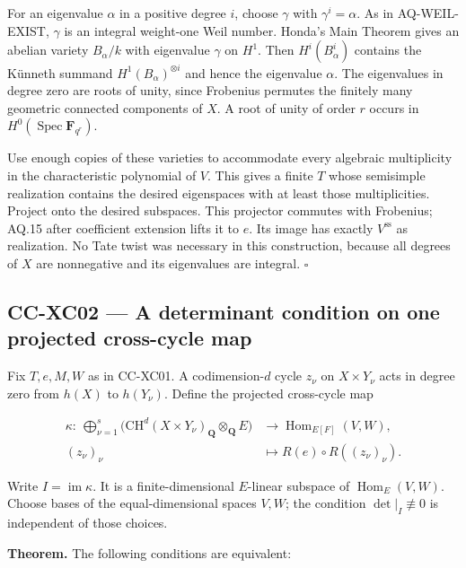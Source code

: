 \documentclass[11pt,a4paper]{article}
\theoremstyle{definition}\newtheorem{definition}[theorem]{Definition}
\theoremstyle{remark}\newtheorem{remark}[theorem]{Remark}
\begin{document}
For an eigenvalue \(\alpha\) in a positive degree \(i\), choose
\(\gamma\) with \(\gamma^i=\alpha\). As in AQ-WEIL-EXIST, \(\gamma\) is
an integral weight-one Weil number. Honda's Main Theorem gives an
abelian variety \(B_\alpha/k\) with eigenvalue \(\gamma\) on \(H^1\).
Then \(H^i(B_\alpha^i)\) contains the Künneth summand
\(H^1(B_\alpha)^{\otimes i}\) and hence the eigenvalue \(\alpha\). The
eigenvalues in degree zero are roots of unity, since Frobenius permutes
the finitely many geometric connected components of \(X\). A root of
unity of order \(r\) occurs in
\(H^0(\operatorname{Spec}\mathbf F_{q^r})\).

Use enough copies of these varieties to accommodate every algebraic
multiplicity in the characteristic polynomial of \(V\). This gives a
finite \(T\) whose semisimple realization contains the desired
eigenspaces with at least those multiplicities. Project onto the desired
subspaces. This projector commutes with Frobenius; AQ.15 after
coefficient extension lifts it to \(e\). Its image has exactly
\(V^{\mathrm{ss}}\) as realization. No Tate twist was necessary in this
construction, because all degrees of \(X\) are nonnegative and its
eigenvalues are integral. \(\square\)

\subsection{CC-XC02 --- A determinant condition on one projected
cross-cycle
map}\label{cc-xc02-a-determinant-condition-on-one-projected-cross-cycle-map}

Fix \(T,e,M,W\) as in CC-XC01. A codimension-\(d\) cycle \(z_\nu\) on
\(X\times Y_\nu\) acts in degree zero from \(h(X)\) to \(h(Y_\nu)\).
Define the projected cross-cycle map

\[
 \begin{split}
 \kappa:\ 
 \bigoplus_{\nu=1}^s
 \bigl(\mathrm{CH}^d(X\times Y_\nu)_{\mathbf Q}
              \otimes_{\mathbf Q}E\bigr)
 &\longrightarrow \operatorname{Hom}_{E[F]}(V,W),\\
 (z_\nu)_\nu&\longmapsto R(e)\circ R((z_\nu)_\nu).
 \end{split}                                      \tag{CC-XC.1}
\]

Write \(I=\operatorname{im}\kappa\). It is a finite-dimensional
\(E\)-linear subspace of \(\operatorname{Hom}_E(V,W)\). Choose bases of
the equal-dimensional spaces \(V,W\); the condition
\(\det|_I\not\equiv0\) is independent of those choices.

\textbf{Theorem.} The following conditions are equivalent:
\end{document}
